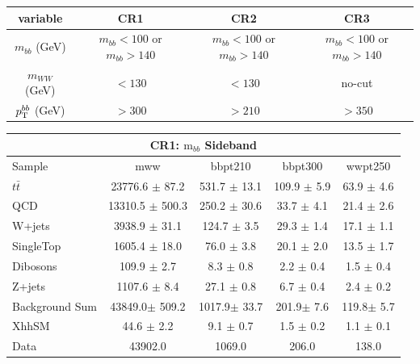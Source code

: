 \documentclass{beamer}
\newcommand*{\ttbar}{\ensuremath{t\bar{t}}\xspace}
\newcommand*{\mbb}{\ensuremath{\text{m}_{bb}}\xspace}
\newcommand*{\header}[1]{\fontsize{16}{8}\selectfont \textbf{{\color{MyPurple}{#1}}}}
\begin{document}
\begin{frame}
\begin{center}
\header{mBBcr}
\end{center}
\begin{table}
\begin{center}
\tiny
\begin{tabular}{c|c|c|c|}
 variable &CR1 	& CR2 	& CR3 \\
\hline					
$m_{bb}$ (GeV)	& $m_{bb} < 100$ or $m_{bb} > 140$ & $m_{bb} < 100$ or $m_{bb} > 140$ & $m_{bb} < 100$ or $m_{bb} > 140$\\
$m_{WW}$ (GeV)   & $<130$ & $<130$& no-cut \\
$p_{\rm T}^{bb}$ (GeV) 	& $>300$ & $>210$&$>350$\\
\hline
\end{tabular}
\end{center}
\end{table}
\end{frame}

\begin{frame}
\begin{center}
\header{CR1}
\end{center}
\begin{table}
\tiny
\begin{tabular}{l|c|c|c|c}
\hline\hline
\multicolumn{5}{c}{\textbf{CR1}: \mbb Sideband}\\\hline\hline
Sample  	& mww 	& bbpt210 	& bbpt300 	& wwpt250 	  \\\hline
\ttbar 	& 23776.6 $\pm$ 87.2 	& 531.7 $\pm$ 13.1 	& 109.9 $\pm$ 5.9 	& 63.9 $\pm$ 4.6 \\\hline 
QCD 	& 13310.5 $\pm$ 500.3 	& 250.2 $\pm$ 30.6 	& 33.7 $\pm$ 4.1 	& 21.4 $\pm$ 2.6	\\\hline 
W+jets 	& 3938.9 $\pm$ 31.1 	& 124.7 $\pm$ 3.5 	& 29.3 $\pm$ 1.4 	& 17.1 $\pm$ 1.1 	\\\hline 
SingleTop 	& 1605.4 $\pm$ 18.0 	& 76.0 $\pm$ 3.8 	& 20.1 $\pm$ 2.0 	& 13.5 $\pm$ 1.7\\\hline 
Dibosons 	& 109.9 $\pm$ 2.7 	& 8.3 $\pm$ 0.8 	& 2.2 $\pm$ 0.4 	& 1.5 $\pm$ 0.4 	\\\hline 
Z+jets 	& 1107.6 $\pm$ 8.4 	& 27.1 $\pm$ 0.8 	& 6.7 $\pm$ 0.4 	& 2.4 $\pm$ 0.2 	\\\hline 
\hline
Background Sum 	& 43849.0$\pm$ 509.2 	& 1017.9$\pm$ 33.7 	& 201.9$\pm$ 7.6 	& 119.8$\pm$ 5.7 \\\hline 
\hline
XhhSM 	& 44.6 $\pm$ 2.2 	& 9.1 $\pm$ 0.7 	& 1.5 $\pm$ 0.2 	& 1.1 $\pm$ 0.1 	\\\hline 
Data 	& 43902.0 	& 1069.0 	& 206.0 	& 138.0 \\\hline 
\hline
\end{tabular}
\end{table}
\end{frame}
\end{document}
